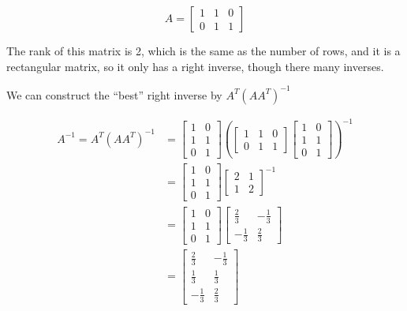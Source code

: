 \documentclass[12pt,letterpaper]{article}
\begin{document}
      \[
        A =
        \begin{bmatrix}
          1 & 1 & 0 \\
          0 & 1 & 1
        \end{bmatrix}
      \]

      The rank of this matrix is 2, which is the same as the number of rows, and it is a rectangular matrix, so it only has a right inverse, though there many inverses.

      We can construct the ``best'' right inverse by $A^T(AA^T)^{-1}$

      \begin{align*}
        A^{-1} = A^T(AA^T)^{-1} &=
        \begin{bmatrix}
          1 & 0 \\
          1 & 1 \\
          0 & 1
        \end{bmatrix}
        \left(
        \begin{bmatrix}
          1 & 1 & 0 \\
          0 & 1 & 1
        \end{bmatrix}
        \begin{bmatrix}
          1 & 0 \\
          1 & 1 \\
          0 & 1
        \end{bmatrix}
        \right)^{-1} \\
        &=
        \begin{bmatrix}
          1 & 0 \\
          1 & 1 \\
          0 & 1
        \end{bmatrix}
        \begin{bmatrix}
          2 & 1 \\
          1 & 2
        \end{bmatrix}^{-1} \\
        &=
        \begin{bmatrix}
          1 & 0 \\
          1 & 1 \\
          0 & 1
        \end{bmatrix}
        \begin{bmatrix}
          \frac{2}{3} & -\frac{1}{3} \\
          -\frac{1}{3} & \frac{2}{3}
        \end{bmatrix} \\
        &=
        \begin{bmatrix}
          \frac{2}{3} & -\frac{1}{3} \\
          \frac{1}{3} & \frac{1}{3} \\
          -\frac{1}{3} & \frac{2}{3}
        \end{bmatrix}
      \end{align*}
\end{document}
